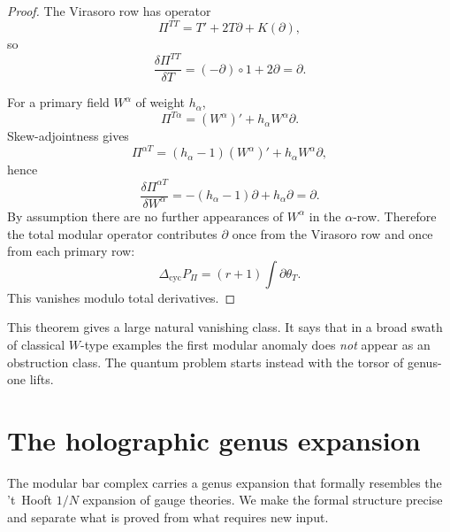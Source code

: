 \begin{proof}
The Virasoro row has operator
\[
\Pi^{TT}=T'+2T\partial+K(\partial),
\]
so
\[
\frac{\delta \Pi^{TT}}{\delta T}=(-\partial)\circ 1 + 2\partial=\partial.
\]

For a primary field $W^\alpha$ of weight $h_\alpha$,
\[
\Pi^{T\alpha}=(W^\alpha)'+h_\alpha W^\alpha\partial.
\]
Skew-adjointness gives
\[
\Pi^{\alpha T}=(h_\alpha-1)(W^\alpha)'+h_\alpha W^\alpha\partial,
\]
hence
\[
\frac{\delta \Pi^{\alpha T}}{\delta W^\alpha}
=-(h_\alpha-1)\partial+h_\alpha\partial=\partial.
\]
By assumption there are no further appearances of $W^\alpha$ in the $\alpha$-row. Therefore
the total modular operator contributes $\partial$ once from the Virasoro row and once from
each primary row:
\[
\Delta_{\mathrm{cyc}}P_\Pi=(r+1)\int \partial \theta_T.
\]
This vanishes modulo total derivatives.
\end{proof}

\begin{remark}
This theorem gives a large natural vanishing class. It says that in a broad swath of
classical $W$-type examples the first modular anomaly does \emph{not} appear as an
obstruction class. The quantum problem starts instead with the torsor of genus-one lifts.
\end{remark}

\section{The holographic genus expansion}
\label{sec:holographic-genus-expansion}

The modular bar complex carries a genus expansion that formally
resembles the 't~Hooft $1/N$ expansion of gauge theories. We
make the formal structure precise and separate what is proved from
what requires new input.

